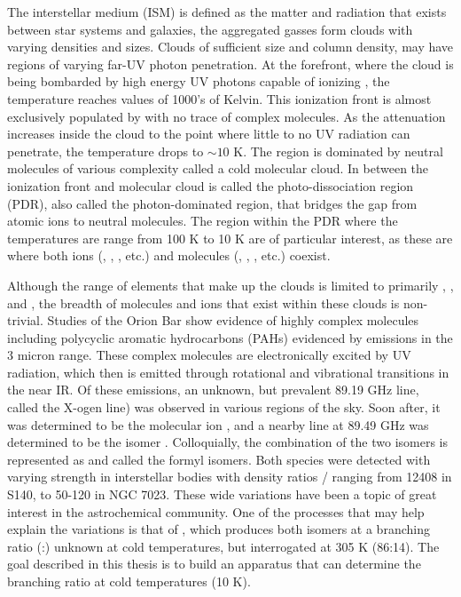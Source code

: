The interstellar medium (ISM) is defined as the matter and radiation that exists between star systems and galaxies, the aggregated gasses form clouds with varying densities and sizes. Clouds of sufficient size and column density, may have regions of varying far-UV photon penetration. At the forefront, where the cloud is being bombarded by high energy UV photons capable of ionizing , the temperature reaches values of 1000's of Kelvin. This ionization front is almost exclusively populated by  with no trace of complex molecules. As the attenuation increases inside the cloud to the point where little to no UV radiation can penetrate, the temperature drops to $\sim 10$ K. The region is dominated by neutral molecules of various complexity called a cold molecular cloud. In between the ionization front and molecular cloud is called the photo-dissociation region (PDR), also called the photon-dominated region, that bridges the gap from atomic ions to neutral molecules. The region within the PDR where the temperatures are range from 100 K to 10 K are of particular interest, as these are where both ions (, , , etc.) and molecules (, , , etc.) coexist.\cite{Hollenbach1997}

Although the range of elements that make up the clouds is limited to primarily , , and , the breadth of molecules and ions that exist within these clouds is non-trivial. Studies of the Orion Bar show evidence of highly complex molecules including polycyclic aromatic hydrocarbons (PAHs) evidenced by emissions in the 3 micron range.\cite{Sloan1997,Bregman1995} These complex molecules are electronically excited by UV radiation, which then is emitted through rotational and vibrational transitions in the near IR. Of these emissions, an unknown, but prevalent 89.19 GHz line, called the X-ogen line) was observed in various regions of the sky.\cite{Buhl1970} Soon after, it was determined to be the molecular ion , and a nearby line at 89.49 GHz was determined to be the isomer . Colloquially, the combination of the two isomers is represented as \ce{[HCO+]} and called the formyl isomers. Both species were detected with varying strength in interstellar bodies with density ratios / ranging from 12408 in S140, to 50-120 in NGC 7023.\cite{Liszt2004} These wide variations have been a topic of great interest in the astrochemical community. One of the processes that may help explain the variations is that of , which produces both isomers at a branching ratio (:) unknown at cold temperatures, but interrogated at 305 K (86:14).\cite{Freeman1987} The goal described in this thesis is to build an apparatus that can determine the branching ratio at cold temperatures (10 K).
